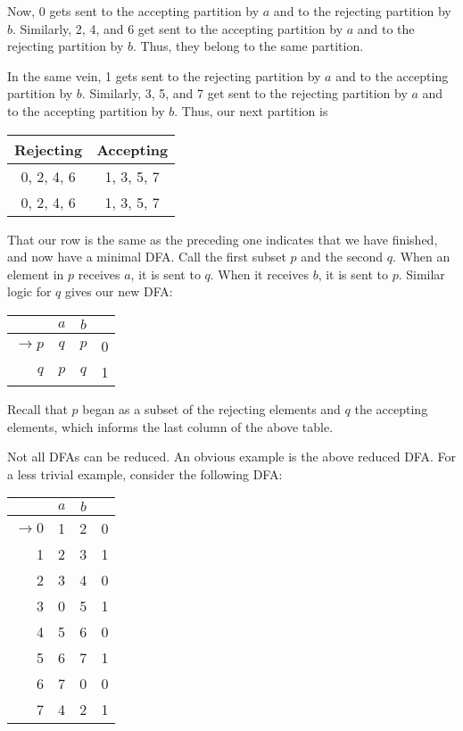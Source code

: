 Now, 0 gets sent to the accepting partition by \(a\) and to the rejecting partition by \(b\). Similarly, 2, 4, and 6 get sent to the accepting partition by \(a\) and to the rejecting partition by \(b\). Thus, they belong to the same partition.

In the same vein, 1 gets sent to the rejecting partition by \(a\) and to the accepting partition by \(b\). Similarly, 3, 5, and 7 get sent to the rejecting partition by \(a\) and to the accepting partition by \(b\). Thus, our next partition is

\begin{center}\begin{tabular}{|c|c|c|c|c|c|c|c|}
\multicolumn{4}{|c|}{Rejecting} & \multicolumn{4}{|c|}{Accepting}\\\bottomrule
\multicolumn{4}{|c|}{0, 2, 4, 6} & \multicolumn{4}{|c|}{1, 3, 5, 7}\\
\multicolumn{4}{|c|}{0, 2, 4, 6} & \multicolumn{4}{|c|}{1, 3, 5, 7}
\end{tabular}\end{center}

That our row is the same as the preceding one indicates that we have finished, and now have a minimal DFA. Call the first subset \(p\) and the second \(q\). When an element in \(p\) receives \(a\), it is sent to \(q\). When it receives \(b\), it is sent to \(p\). Similar logic for \(q\) gives our new DFA:

\begin{center}\begin{tabular}{r| c c r}
         & \(a\) & \(b\) & \\\bottomrule
         \(\to p\) & \(q\) & \(p\) & 0\\
               \(q\) & \(p\) & \(q\) & 1\\
    \end{tabular}\end{center}

Recall that \(p\) began as a subset of the rejecting elements and \(q\) the accepting elements, which informs the last column of the above table.
    
Not all DFAs can be reduced. An obvious example is the above reduced DFA. For a less trivial example, consider the following DFA:
   
    \begin{center}\begin{tabular}{r| c c r}
         & \(a\) & \(b\) & \\\bottomrule
         \(\to 0\) & 1 & 2 & 0\\
               1 & 2 & 3 & 1\\
               2 & 3 & 4 & 0\\
               3 & 0 & 5 & 1\\
               4 & 5 & 6 & 0\\
               5 & 6 & 7 & 1\\
               6 & 7 & 0 & 0\\
               7 & 4 & 2 & 1
    \end{tabular}\end{center}

